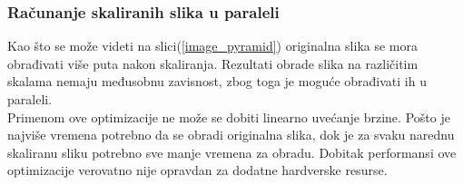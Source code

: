 \subsubsection{Računanje skaliranih slika u paraleli}

Kao što se može videti na slici(\ref{image_pyramid}) originalna slika se mora
obrađivati više puta nakon skaliranja.
Rezultati obrade slika na različitim skalama nemaju međusobnu zavisnost, zbog
toga je moguće obrađivati ih u paraleli. \\

Primenom ove optimizacije ne može se dobiti linearno uvećanje brzine.
Pošto je najviše vremena potrebno da se obradi originalna slika, dok je za svaku
narednu skaliranu sliku potrebno sve manje vremena za obradu.
Dobitak performansi ove optimizacije verovatno nije opravdan za dodatne
hardverske resurse.
